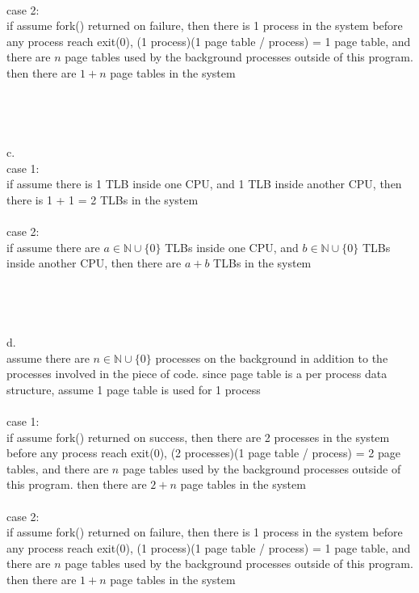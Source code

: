 \documentclass[12pt, border = 4pt, multi]{article} %
\begin{document}
\\
case 2:\\
if assume fork() returned on failure, then there is 1 process in the system before any process reach exit(0), (1 process)(1 page table / process) = 1 page table, and there are $n$ page tables used by the background processes outside of this program. then there are $1 + n$ page tables in the system\\
\\
\\
\\
\\
c.\\
case 1:\\
if assume there is 1 TLB inside one CPU, and 1 TLB inside another CPU, then there is 1 + 1 = 2 TLBs in the system\\
\\
case 2:\\
if assume there are $a \in \mathbb{N} \cup \{0\}$ TLBs inside one CPU, and $b \in \mathbb{N} \cup \{0\}$ TLBs inside another CPU, then there are $a + b$ TLBs in the system\\
\\
\\
\\
\\
d.\\
assume there are $n \in \mathbb{N} \cup \{0\}$ processes on the background in addition to the processes involved in the piece of code. since page table is a per process data structure, assume 1 page table is used for 1 process\\
\\
case 1:\\
if assume fork() returned on success, then there are 2 processes in the system before any process reach exit(0), (2 processes)(1 page table / process) = 2 page tables, and there are $n$ page tables used by the background processes outside of this program. then there are $2 + n$ page tables in the system\\
\\
case 2:\\
if assume fork() returned on failure, then there is 1 process in the system before any process reach exit(0), (1 process)(1 page table / process) = 1 page table, and there are $n$ page tables used by the background processes outside of this program. then there are $1 + n$ page tables in the system\\
\end{document}
